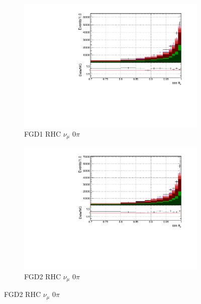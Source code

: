 \begin{figure}[!h]
\begin{subfigure}{0.49\textwidth}
  \centering
  \includegraphics[width=\textwidth]{figs/FGD1_NuMuBkg_CC0pi_in_AntiNu_Mode_t}
  \caption{FGD1 RHC $\nu_{\mu}$ 0$\pi$}
\end{subfigure}
\begin{subfigure}{0.49\textwidth}
  \centering
  \includegraphics[width=\textwidth]{figs/FGD2_NuMuBkg_CC0pi_in_AntiNu_Mode_t}
  \caption{FGD2 RHC $\nu_{\mu}$ 0$\pi$}
\end{subfigure}


\end{figure}
